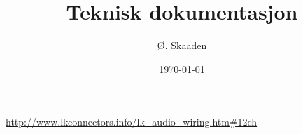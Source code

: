 \documentclass[11pt,norsk]{teknisk-notat}
\title{Teknisk dokumentasjon}
\author{Ø. Skaaden}
\date{\today}
\begin{document}
\maketitle

\toc

\url{http://www.lkconnectors.info/lk_audio_wiring.htm#12ch}


{}

\printbibliography

\appendix
%
\end{document}
